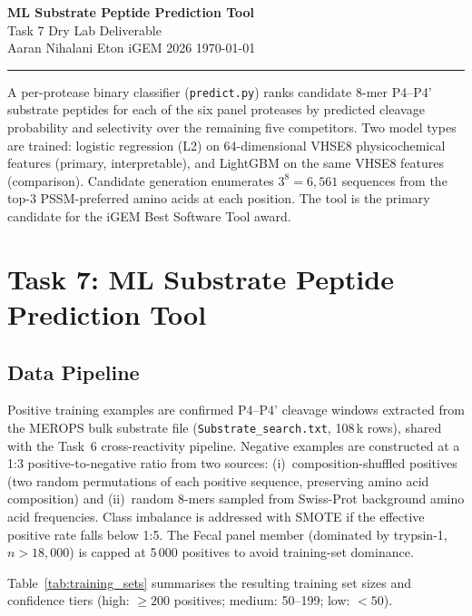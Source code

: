 \documentclass[10pt,a4paper]{article}
\begin{document}
\begin{center}
  {\LARGE\bfseries ML Substrate Peptide Prediction Tool}\\[0.15em]
  {\normalsize Task 7 \textbullet{} Dry Lab Deliverable}\\[0.08em]
  {\small Aaran Nihalani \textbullet{} Eton iGEM 2026 \textbullet{} \today}
\end{center}
\vspace{0.3em}\hrule\vspace{0.5em}

A per-protease binary classifier (\texttt{predict.py}) ranks candidate 8-mer P4--P4'
substrate peptides for each of the six panel proteases by predicted cleavage probability
and selectivity over the remaining five competitors. Two model types are trained:
logistic regression (L2) on 64-dimensional VHSE8 physicochemical features (primary,
interpretable), and LightGBM on the same VHSE8 features (comparison). Candidate
generation enumerates $3^8 = 6{,}561$ sequences from the top-3 PSSM-preferred amino
acids at each position. The tool is the primary candidate for the iGEM Best Software
Tool award.

\section{Task 7: ML Substrate Peptide Prediction Tool}

\subsection{Data Pipeline}

Positive training examples are confirmed P4--P4' cleavage windows extracted from the MEROPS
bulk substrate file (\texttt{Substrate\_search.txt}, 108\,k rows), shared with the Task~6
cross-reactivity pipeline. Negative examples are constructed at a 1:3 positive-to-negative
ratio from two sources: (i)~composition-shuffled positives (two random permutations of each
positive sequence, preserving amino acid composition) and (ii)~random 8-mers sampled from
Swiss-Prot background amino acid frequencies. Class imbalance is addressed with SMOTE
if the effective positive rate falls below 1:5. The Fecal panel member
(dominated by trypsin-1, $n > 18{,}000$) is capped at 5\,000 positives to avoid
training-set dominance.

Table~\ref{tab:training_sets} summarises the resulting training set sizes and confidence
tiers (high: $\geq 200$ positives; medium: 50--199; low: $<50$).
\end{document}
